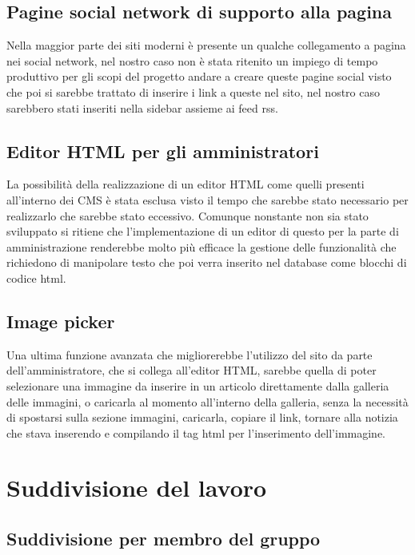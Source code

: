 \documentclass[openany, a4paper, 12pt]{report}
\begin{document}
		\section{Pagine social network di supporto alla pagina}
		Nella maggior parte dei siti moderni è presente un qualche collegamento a pagina nei social network, nel nostro caso non è stata ritenito un impiego di tempo produttivo per gli scopi del progetto andare a creare queste pagine social visto che poi si sarebbe trattato di inserire i link a queste nel sito, nel nostro caso sarebbero stati inseriti nella sidebar assieme ai feed rss.

		\section{Editor HTML per gli amministratori}
		La possibilità della realizzazione di un editor HTML come quelli presenti all'interno dei CMS è stata esclusa visto il tempo che sarebbe stato necessario per realizzarlo che sarebbe stato eccessivo. Comunque nonstante non sia stato sviluppato si ritiene che l'implementazione di un editor di questo per la parte di amministrazione renderebbe molto più efficace la gestione delle funzionalità che richiedono di manipolare testo che poi verra inserito nel database come blocchi di codice html.   
		
		\section{Image picker}
		Una ultima funzione avanzata che migliorerebbe l'utilizzo del sito da parte dell'amministratore, che si collega all'editor HTML, sarebbe quella di poter selezionare una immagine da inserire in un articolo direttamente dalla galleria delle immagini, o caricarla al momento all'interno della galleria, senza la necessità di spostarsi sulla sezione immagini, caricarla, copiare il link, tornare alla notizia che stava inserendo e compilando il tag html per l'inserimento dell'immagine.



	\chapter{Suddivisione del lavoro}
	\section{Suddivisione per membro del gruppo}
\end{document}

